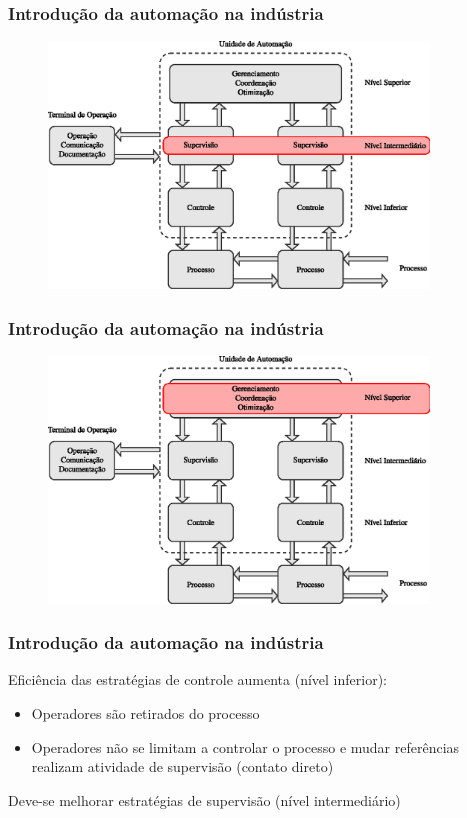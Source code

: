 \documentclass{beamer}
\begin{document}
\begin{frame}
    \frametitle{Introdução da automação na indústria}

\begin{figure}[htb]
\centering
    \includegraphics[width=0.9\textwidth]
    {imgs/introducao/eps/esquema_automacao_int}
\end{figure}
\end{frame}

\begin{frame}
    \frametitle{Introdução da automação na indústria}

\begin{figure}[htb]
\centering
    \includegraphics[width=0.9\textwidth]
    {imgs/introducao/eps/esquema_automacao_sup}
\end{figure}
\end{frame}

\begin{frame}
    \frametitle{Introdução da automação na indústria}

    Eficiência das estratégias de controle aumenta (nível inferior):

\begin{itemize}
    \item Operadores são retirados do processo
    \item Operadores não se limitam a controlar o processo e mudar referências
          \implica realizam atividade de supervisão (contato direto)
\end{itemize}

    Deve-se melhorar estratégias de supervisão (nível intermediário)

\end{frame}
\end{document}
